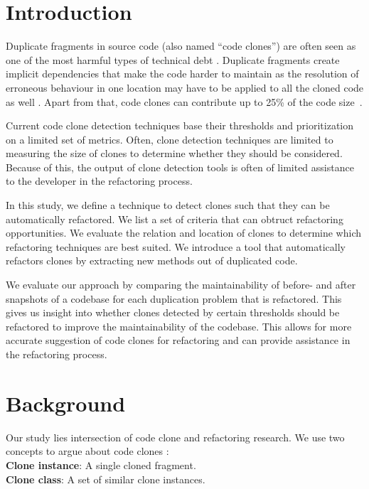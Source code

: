 \documentclass[sigconf,review, table]{acmart}
\begin{document}

\maketitle

\section{Introduction}
Duplicate fragments in source code (also named ``code clones'') are often seen as one of the most harmful types of technical debt \cite{fowler2018refactoring}. Duplicate fragments create implicit dependencies that make the code harder to maintain as the resolution of erroneous behaviour in one location may have to be applied to all the cloned code as well \cite{ostberg2014automatically}. Apart from that, code clones can contribute up to 25\% of the code size~\cite{bruntink2005use}.

Current code clone detection techniques base their thresholds and prioritization on a limited set of metrics. Often, clone detection techniques are limited to measuring the size of clones to determine whether they should be considered. Because of this, the output of clone detection tools is often of limited assistance to the developer in the refactoring process.

In this study, we define a technique to detect clones such that they can be automatically refactored. We list a set of criteria that can obtruct refactoring opportunities. We evaluate the relation and location of clones to determine which refactoring techniques are best suited. We introduce a tool that automatically refactors clones by extracting new methods out of duplicated code.

We evaluate our approach by comparing the maintainability of before- and after snapshots of a codebase for each duplication problem that is refactored. This gives us insight into whether clones detected by certain thresholds should be refactored to improve the maintainability of the codebase. This allows for more accurate suggestion of code clones for refactoring and can provide assistance in the refactoring process.

\section{Background}
Our study lies intersection of code clone and refactoring research. %
We use two concepts to argue about code clones \cite{roy2007survey}:
\\ \textbf{Clone instance}: A single cloned fragment.
\\ \textbf{Clone class}: A set of similar clone instances.
\end{document}
